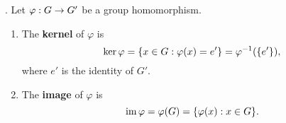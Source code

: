 . Let \(\varphi: G \rightarrow G'\) be a group homomorphism.
\begin{enumerate}
    \item {} The \textbf{kernel} of \(\varphi\) is
    \[
        \ker \varphi = \{x \in G : \varphi(x) = e'\} = \varphi^{-1}(\{e'\}),
    \]
    where \(e'\) is the identity of \(G'\).
    \item {} The \textbf{image} of \(\varphi\) is
    \[
        \operatorname{im} \varphi = \varphi(G) = \{\varphi(x) : x \in G\}.
    \]
\end{enumerate}

\pagebreak
